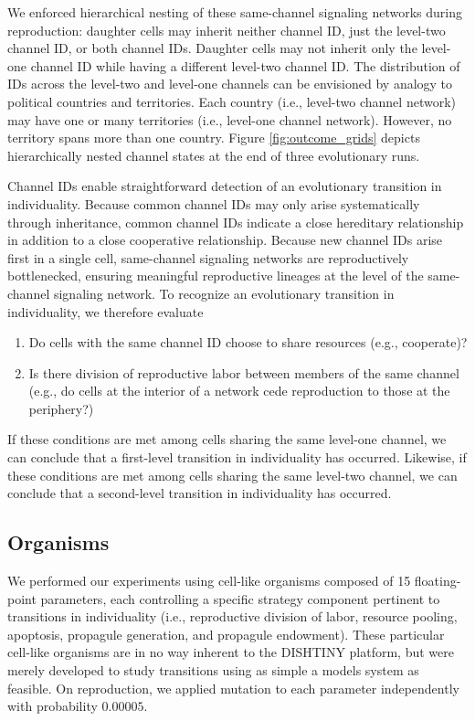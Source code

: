 We enforced hierarchical nesting of these same-channel signaling networks during reproduction:
daughter cells may inherit neither channel ID, just the level-two channel ID, or both channel IDs.
Daughter cells may not inherit only the level-one channel ID while having a different level-two channel ID.
The distribution of IDs across the level-two and level-one channels can be envisioned by analogy to political countries and territories.
Each country (i.e., level-two channel network) may have one or many territories (i.e., level-one channel network).
However, no territory spans more than one country.
Figure \ref{fig:outcome_grids} depicts hierarchically nested channel states at the end of three evolutionary runs.

Channel IDs enable straightforward detection of an evolutionary transition in individuality.
Because common channel IDs may only arise systematically through inheritance, common channel IDs indicate a close hereditary relationship in addition to a close cooperative relationship.
Because new channel IDs arise first in a single cell, same-channel signaling networks are reproductively bottlenecked, ensuring meaningful reproductive lineages at the level of the same-channel signaling network.
To recognize an evolutionary transition in individuality, we therefore evaluate
\begin{enumerate}
\item Do cells with the same channel ID choose to share resources (e.g., cooperate)?
\item Is there division of reproductive labor between members of the same channel (e.g., do cells at the interior of a network cede reproduction to those at the periphery?)
\end{enumerate}
If these conditions are met among cells sharing the same level-one channel, we can conclude that a first-level transition in individuality has occurred.
Likewise, if these conditions are met among cells sharing the same level-two channel, we can conclude that a second-level transition in individuality has occurred.

\subsection{Organisms}

We performed our experiments using cell-like organisms composed of 15 floating-point parameters, each controlling a specific strategy component pertinent to transitions in individuality (i.e., reproductive division of labor, resource pooling, apoptosis, propagule generation, and propagule endowment).
These particular cell-like organisms are in no way inherent to the DISHTINY platform, but were merely developed to study transitions using as simple a models system as feasible.
On reproduction, we applied mutation to each parameter independently with probability $0.00005$.

